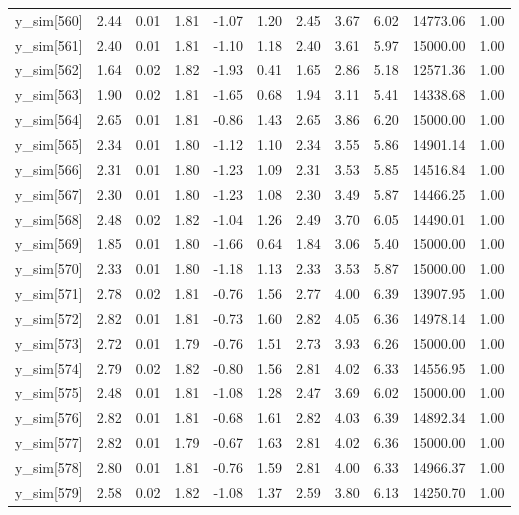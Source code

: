 \begin{table}[ht]
\begin{tabular}{rrrrrrrrrrr}
  y\_sim[560] & 2.44 & 0.01 & 1.81 & -1.07 & 1.20 & 2.45 & 3.67 & 6.02 & 14773.06 & 1.00 \\ 
  y\_sim[561] & 2.40 & 0.01 & 1.81 & -1.10 & 1.18 & 2.40 & 3.61 & 5.97 & 15000.00 & 1.00 \\ 
  y\_sim[562] & 1.64 & 0.02 & 1.82 & -1.93 & 0.41 & 1.65 & 2.86 & 5.18 & 12571.36 & 1.00 \\ 
  y\_sim[563] & 1.90 & 0.02 & 1.81 & -1.65 & 0.68 & 1.94 & 3.11 & 5.41 & 14338.68 & 1.00 \\ 
  y\_sim[564] & 2.65 & 0.01 & 1.81 & -0.86 & 1.43 & 2.65 & 3.86 & 6.20 & 15000.00 & 1.00 \\ 
  y\_sim[565] & 2.34 & 0.01 & 1.80 & -1.12 & 1.10 & 2.34 & 3.55 & 5.86 & 14901.14 & 1.00 \\ 
  y\_sim[566] & 2.31 & 0.01 & 1.80 & -1.23 & 1.09 & 2.31 & 3.53 & 5.85 & 14516.84 & 1.00 \\ 
  y\_sim[567] & 2.30 & 0.01 & 1.80 & -1.23 & 1.08 & 2.30 & 3.49 & 5.87 & 14466.25 & 1.00 \\ 
  y\_sim[568] & 2.48 & 0.02 & 1.82 & -1.04 & 1.26 & 2.49 & 3.70 & 6.05 & 14490.01 & 1.00 \\ 
  y\_sim[569] & 1.85 & 0.01 & 1.80 & -1.66 & 0.64 & 1.84 & 3.06 & 5.40 & 15000.00 & 1.00 \\ 
  y\_sim[570] & 2.33 & 0.01 & 1.80 & -1.18 & 1.13 & 2.33 & 3.53 & 5.87 & 15000.00 & 1.00 \\ 
  y\_sim[571] & 2.78 & 0.02 & 1.81 & -0.76 & 1.56 & 2.77 & 4.00 & 6.39 & 13907.95 & 1.00 \\ 
  y\_sim[572] & 2.82 & 0.01 & 1.81 & -0.73 & 1.60 & 2.82 & 4.05 & 6.36 & 14978.14 & 1.00 \\ 
  y\_sim[573] & 2.72 & 0.01 & 1.79 & -0.76 & 1.51 & 2.73 & 3.93 & 6.26 & 15000.00 & 1.00 \\ 
  y\_sim[574] & 2.79 & 0.02 & 1.82 & -0.80 & 1.56 & 2.81 & 4.02 & 6.33 & 14556.95 & 1.00 \\ 
  y\_sim[575] & 2.48 & 0.01 & 1.81 & -1.08 & 1.28 & 2.47 & 3.69 & 6.02 & 15000.00 & 1.00 \\ 
  y\_sim[576] & 2.82 & 0.01 & 1.81 & -0.68 & 1.61 & 2.82 & 4.03 & 6.39 & 14892.34 & 1.00 \\ 
  y\_sim[577] & 2.82 & 0.01 & 1.79 & -0.67 & 1.63 & 2.81 & 4.02 & 6.36 & 15000.00 & 1.00 \\ 
  y\_sim[578] & 2.80 & 0.01 & 1.81 & -0.76 & 1.59 & 2.81 & 4.00 & 6.33 & 14966.37 & 1.00 \\ 
  y\_sim[579] & 2.58 & 0.02 & 1.82 & -1.08 & 1.37 & 2.59 & 3.80 & 6.13 & 14250.70 & 1.00 \\ 

\end{tabular}
\end{table}

